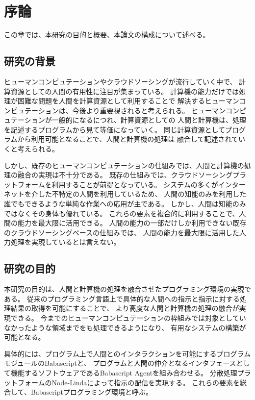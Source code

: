 \chapter{序論}\label{chap:introduction}

この章では、本研究の目的と概要、本論文の構成について述べる。

\newpage

\section{研究の背景}\label{ux7814ux7a76ux306eux80ccux666f}

ヒューマンコンピュテーションやクラウドソーシングが流行していく中で、
計算資源としての人間の有用性に注目が集まっている。
計算機の能力だけでは処理が困難な問題を人間を計算資源として利用することで
解決するヒューマンコンピュテーションは、今後より重要視されると考えられる。
ヒューマンコンピュテーションが一般的になるにつれ、計算資源としての
人間と計算機は、処理を記述するプログラムから見て等価になっていく。
同じ計算資源としてプログラムから利用可能となることで、人間と計算機の処理は
融合して記述されていくと考えられる。

しかし、既存のヒューマンコンピュテーションの仕組みでは、人間と計算機の処理の融合の実現は不十分である。
既存の仕組みでは、クラウドソーシングプラットフォームを利用することが前提となっている。
システムの多くがインターネットを介した不特定の人間を利用しているため、
人間の知能のみを利用した誰でもできるような単純な作業への応用が主である。
しかし、人間は知能のみではなくその身体も優れている。
これらの要素を複合的に利用することで、人間の能力を最大限に活用できる。
人間の能力の一部だけしか利用できない既存のクラウドソーシングベースの仕組みでは、
人間の能力を最大限に活用した人力処理を実現しているとは言えない。

\section{研究の目的}\label{ux7814ux7a76ux306eux76eeux7684}

本研究の目的は、人間と計算機の処理を融合させたプログラミング環境の実現である。
従来のプログラミング言語上で具体的な人間への指示と指示に対する処理結果の取得を可能にすることで、
より高度な人間と計算機の処理の融合が実現できる。
今までのヒューマンコンピュテーションの枠組みでは対象としていなかったような領域までをも処理できるようになり、
有用なシステムの構築が可能となる。

具体的には、プログラム上で人間とのインタラクションを可能にするプログラムモジュールのBabascriptと、
プログラムと人間の仲介となるインタフェースとして機能するソフトウェアであるBabascript
Agentを組み合わせる。
分散処理プラットフォームのNode-Lindaによって指示の配信を実現する。
これらの要素を総合して、Babascriptプログラミング環境と呼ぶ。

